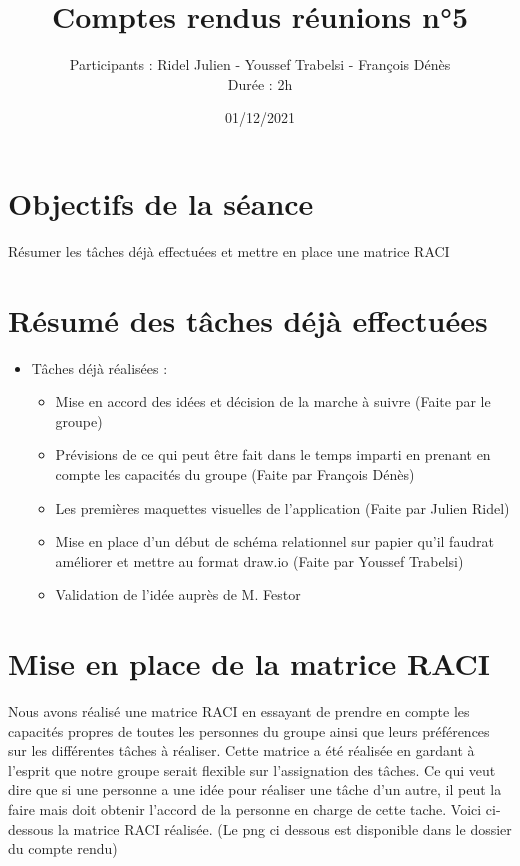 \documentclass{article}
\title{\Huge Comptes rendus réunions n°5}
\author{Participants : Ridel Julien - Youssef Trabelsi - François Dénès \\ Durée : 2h}
\date{01/12/2021}
\begin{document}
\maketitle

\section{\huge Objectifs de la séance }

\Large Résumer les tâches déjà effectuées et mettre en place une matrice RACI

\section{\huge Résumé des tâches déjà effectuées}

\begin{itemize}

    \item \Large Tâches déjà réalisées :
    
    \begin{itemize}
        \item \Large Mise en accord des idées et décision de la marche à suivre (Faite par le groupe)
        \item \Large  Prévisions de ce qui peut être fait dans le temps imparti en prenant en compte les capacités du groupe (Faite par François Dénès)
        \item \Large Les premières maquettes visuelles de l'application (Faite par Julien Ridel)
        \item \Large Mise en place d'un début de schéma relationnel sur papier qu'il faudrat améliorer et mettre au format draw.io (Faite par Youssef Trabelsi)
        \item \Large  Validation de l'idée auprès de M. Festor
    \end{itemize} 
\end{itemize}

\section{\huge Mise en place de la matrice RACI}

\Large Nous avons réalisé une matrice RACI en essayant de prendre en compte les capacités propres de toutes les personnes du groupe ainsi que leurs préférences sur les différentes tâches à réaliser. Cette matrice a été réalisée en gardant à l'esprit que notre groupe serait flexible sur l'assignation des tâches. Ce qui veut dire que si une personne a une idée pour réaliser une tâche d'un autre, il peut la faire mais doit obtenir l'accord de la personne en charge de cette tache.
Voici ci-dessous la matrice RACI réalisée. (Le png ci dessous est disponible dans le dossier du compte rendu) 
\end{document}
